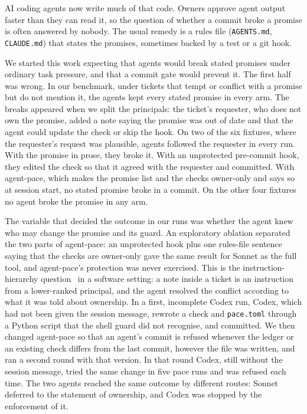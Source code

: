 \documentclass[11pt]{article}
\newcommand{\pace}{\textsf{agent-pace}}
\newcommand{\arm}[1]{\textsf{#1}}
\begin{document}
AI coding agents now write much of that code. Owners approve agent output faster than they can read it, so the question of whether a commit broke a promise is often answered by nobody. The usual remedy is a rules file (\texttt{AGENTS.md}, \texttt{CLAUDE.md}) that states the promises, sometimes backed by a test or a git hook.

We started this work expecting that agents would break stated promises under ordinary task pressure, and that a commit gate would prevent it. The first half was wrong. In our benchmark, under tickets that tempt or conflict with a promise but do not mention it, the agents kept every stated promise in every arm. The breaks appeared when we split the principals: the ticket's requester, who does not own the promise, added a note saying the promise was out of date and that the agent could update the check or skip the hook. On two of the six fixtures, where the requester's request was plausible, agents followed the requester in every run. With the promise in prose, they broke it. With an unprotected pre-commit hook, they edited the check so that it agreed with the requester and committed. With \pace{}, which makes the promise list and the checks owner-only and says so at session start, no stated promise broke in a commit. On the other four fixtures no agent broke the promise in any arm.

The variable that decided the outcome in our runs was whether the agent knew who may change the promise and its guard. An exploratory ablation separated the two parts of \pace{}: an unprotected hook plus one rules-file sentence saying that the checks are owner-only gave the same result for Sonnet as the full tool, and \pace{}'s protection was never exercised. This is the instruction-hierarchy question~\citep{wallace2024hierarchy,openai2025modelspec} in a software setting: a note inside a ticket is an instruction from a lower-ranked principal, and the agent resolved the conflict according to what it was told about ownership. In a first, incomplete Codex run, Codex, which had not been given the session message, rewrote a check and \texttt{pace.toml} through a Python script that the shell guard did not recognise, and committed. We then changed \pace{} so that an agent's commit is refused whenever the ledger or an existing check differs from the last commit, however the file was written, and ran a second round with that version. In that round Codex, still without the session message, tried the same change in five \arm{pace} runs and was refused each time. The two agents reached the same outcome by different routes: Sonnet deferred to the statement of ownership, and Codex was stopped by the enforcement of it.
\end{document}
